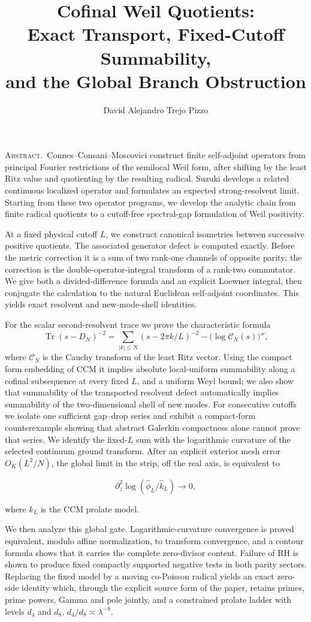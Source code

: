\documentclass[11pt]{amsart}
\title[Cofinal Weil quotients]
{Cofinal Weil Quotients:\\
Exact Transport, Fixed-Cutoff Summability,\\
and the Global Branch Obstruction}
\author{David Alejandro Trejo Pizzo}
\theoremstyle{definition}
\theoremstyle{remark}
\newcommand{\Tr}{\operatorname{Tr}}
\begin{document}
\maketitle

\begingroup\small\noindent\textsc{Abstract.}\ Connes--Consani--Moscovici construct finite self-adjoint operators from
principal Fourier restrictions of the semilocal Weil form, after shifting by
the least Ritz value and quotienting by the resulting radical.  Suzuki
develops a related continuous localized operator and formulates an expected
strong-resolvent limit.  Starting from these two operator programs, we
develop the analytic chain from finite radical quotients to a cutoff-free
spectral-gap formulation of Weil positivity.

At a fixed physical cutoff \(L\), we construct canonical isometries between
successive positive quotients.  The associated generator defect is computed
exactly.  Before the metric correction it is a sum of two rank-one channels
of opposite parity; the correction is the double-operator-integral transform
of a rank-two commutator.  We give both a divided-difference formula and an
explicit Loewner integral, then conjugate the calculation to the natural
Euclidean self-adjoint coordinates.  This yields exact resolvent and
new-mode-shell identities.

For the scalar second-resolvent trace we prove the characteristic formula
\[
 \Tr(s-D_N)^{-2}
 =\sum_{|k|\le N}(s-2\pi k/L)^{-2}
  -\bigl(\log\mathcal C_N(s)\bigr)'',
\]
where \(\mathcal C_N\) is the Cauchy transform of the least Ritz vector.  Using the compact form embedding of CCM it implies absolute local-uniform
summability along a cofinal subsequence at every fixed \(L\), and a uniform
Weyl bound; we also show that
summability of the transported resolvent defect automatically implies
summability of the two-dimensional shell of new modes.  For consecutive
cutoffs we isolate one sufficient gap--drop series and exhibit a compact-form
counterexample showing that abstract Galerkin compactness alone cannot prove
that series.  We identify the fixed-\(L\) sum with the logarithmic curvature
of the selected continuum ground transform.  After an explicit exterior
mesh error \(O_K(L^2/N)\), the global limit in the strip, off the real axis, is equivalent to

\[
 \partial_z^2\log(\widehat\phi_L/\widehat k_L)\longrightarrow0,
\]

where \(k_L\) is the CCM prolate model.

We then analyze this global gate.  Logarithmic-curvature convergence is
proved equivalent, modulo affine normalization, to transform convergence,
and a contour formula shows that it carries the complete zero-divisor
content.  Failure of RH is shown to produce fixed compactly supported
negative tests in both parity sectors.  Replacing the fixed model by a
moving co-Poisson radical yields an exact zero-side identity which, through
the explicit source form of the paper, retains primes, prime powers, Gamma
and pole jointly, and a constrained prolate ladder with
levels \(d_4\) and \(d_8\), \(d_4/d_8\asymp\lambda^{-8}\).
\end{document}
